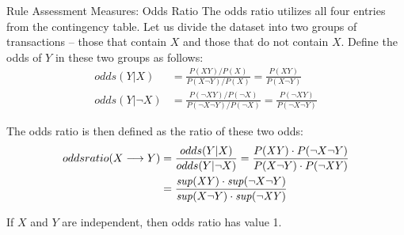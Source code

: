 \begin{frame}{Rule Assessment Measures: Odds Ratio}
The odds ratio utilizes all
four entries from the contingency table.
Let
us divide the dataset into two groups of transactions -- those
that contain $X$ and those that do not contain $X$. Def\/{i}ne the
odds of $Y$ in these two groups as follows:
\begin{align*}
  odds(Y|X) &= \frac{P(\mathit{XY})/P(X)}{P(X\neg Y)/P(X)}
  =\frac{P(\mathit{XY})}{P(X\neg Y)}\\
  odds(Y|\neg X) &=
  \frac{P(\neg \mathit{XY})/P(\neg X)}{P(\neg X\neg Y)/P(\neg X)}
  =\frac{P(\neg \mathit{XY})}{P(\neg X\neg Y)}
\end{align*}

The odds ratio is then def\/{i}ned as the ratio of these two odds:
\begin{align*}
  \oddsratio(X \arule Y) &= \frac{odds(Y|X)}{odds(Y|\neg X)}
   =
   \frac{P(\mathit{XY}) \cdot P(\neg  X \neg Y)}{P(X \neg Y) \cdot P(\neg \mathit{XY})}\\
   & = \frac{\supp(\mathit{XY}) \cdot \supp(\neg X\neg Y)}
    {\supp(X\neg Y)\cdot \supp(\neg \mathit{XY})}
\end{align*}

If $X$ and $Y$ are
independent, then odds ratio has value 1. 
\end{frame}





